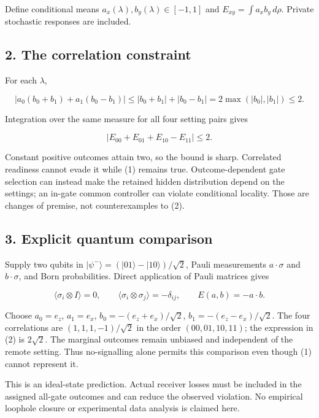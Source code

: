\documentclass[11pt,a4paper]{article}
\begin{document}
Define conditional means \(a_x(\lambda),b_y(\lambda)\in[-1,1]\) and
\(E_{xy}=\int a_xb_y\,d\rho\). Private stochastic responses are
included.

\hypertarget{the-correlation-constraint}{%
\subsection{2. The correlation
constraint}\label{the-correlation-constraint}}

For each \(\lambda\),

\[|a_0(b_0+b_1)+a_1(b_0-b_1)|
\le |b_0+b_1|+|b_0-b_1|
=2\max(|b_0|,|b_1|)\le2.\]

Integration over the same measure for all four setting pairs gives

\[|E_{00}+E_{01}+E_{10}-E_{11}|\le2. \tag{2}\]

Constant positive outcomes attain two, so the bound is sharp. Correlated
readiness cannot evade it while (1) remains true. Outcome-dependent gate
selection can instead make the retained hidden distribution depend on
the settings; an in-gate common controller can violate conditional
locality. Those are changes of premise, not counterexamples to (2).

\hypertarget{explicit-quantum-comparison}{%
\subsection{3. Explicit quantum
comparison}\label{explicit-quantum-comparison}}

Supply two qubits in \(|\psi^-\rangle=(|01\rangle-|10\rangle)/\sqrt2\),
Pauli measurements \(a\cdot\sigma\) and \(b\cdot\sigma\), and Born
probabilities. Direct application of Pauli matrices gives

\[\langle\sigma_i\otimes I\rangle=0,\qquad
\langle\sigma_i\otimes\sigma_j\rangle=-\delta_{ij},\qquad
E(a,b)=-a\cdot b. \tag{3}\]

Choose \(a_0=e_z\), \(a_1=e_x\), \(b_0=-(e_z+e_x)/\sqrt2\),
\(b_1=-(e_z-e_x)/\sqrt2\). The four correlations are
\((1,1,1,-1)/\sqrt2\) in the order \((00,01,10,11)\); the expression in
(2) is \(2\sqrt2\). The marginal outcomes remain unbiased and
independent of the remote setting. Thus no-signalling alone permits this
comparison even though (1) cannot represent it.

This is an ideal-state prediction. Actual receiver losses must be
included in the assigned all-gate outcomes and can reduce the observed
violation. No empirical loophole closure or experimental data analysis
is claimed here.
\end{document}
